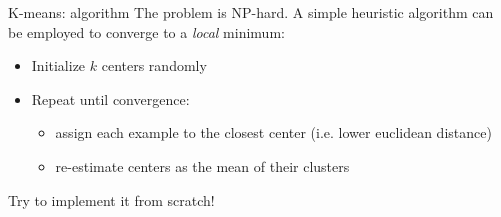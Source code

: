 \begin{frame}{K-means: algorithm}
The problem is NP-hard. A simple heuristic algorithm can be employed to converge to a \emph{local} minimum:
\begin{itemize}
\item Initialize $k$ centers randomly
\item Repeat until convergence:
\begin{itemize}
\item assign each example to the closest center (i.e. lower euclidean distance)
\item re-estimate centers as the mean of their clusters
\end{itemize}
\end{itemize}
Try to implement it from scratch!
\end{frame}